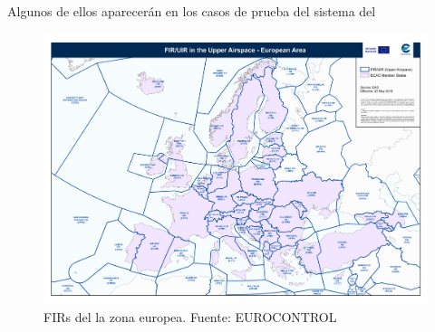 Algunos de ellos aparecerán en los casos de prueba del sistema del 
\begin{figure}
	\centering
	\includegraphics[width=1\linewidth]{capitulos/Capitulo2-Definicion-del-problema/recursos/FIR_europa}
	\caption{FIRs del la zona europea. Fuente: EUROCONTROL}
	\label{fig:fireuropa}
\end{figure}


